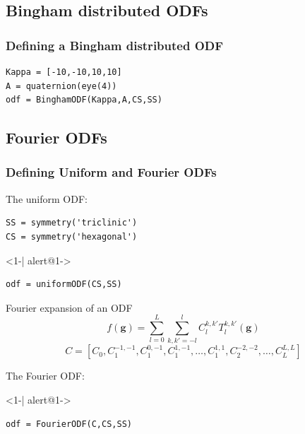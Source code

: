 \subsection*{Bingham distributed ODFs}

\begin{frame}[fragile]
  \frametitle{Defining a Bingham distributed ODF}

\begin{lstlisting}
Kappa = [-10,-10,10,10]
A = quaternion(eye(4))
odf = BinghamODF(Kappa,A,CS,SS)
\end{lstlisting}

\end{frame}

\subsection*{Fourier ODFs}

\begin{frame}[fragile]
  \frametitle{Defining Uniform and  Fourier ODFs}

  The uniform ODF:
\begin{lstlisting}
SS = symmetry('triclinic')
CS = symmetry('hexagonal')
\end{lstlisting}

  \begin{actionenv}<1-| alert@1->
\begin{lstlisting}
odf = uniformODF(CS,SS)
\end{lstlisting}
  \end{actionenv}

  \begin{block}{Fourier expansion of an ODF}
    \begin{equation*}
      f(\mathbf g) = \sum_{l=0}^L \sum_{k,k'=-l}^l C_l^{k,k'} T_l^{k,k'}(\mathbf g)
    \end{equation*}
    \begin{equation*}
      C = [C_0,C_1^{-1,-1},C_1^{0,-1},C_1^{1,-1},\ldots,C_1^{1,1},C_2^{-2,-2},\ldots,C_L^{L,L}]
    \end{equation*}
  \end{block}
The Fourier ODF:
  \begin{actionenv}<1-| alert@1->
\begin{lstlisting}
odf = FourierODF(C,CS,SS)
\end{lstlisting}
  \end{actionenv}



\end{frame}

